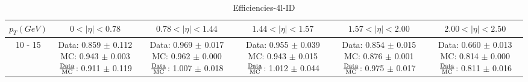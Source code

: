 \documentclass[final,letterpaper,twoside,12pt]{article}
\begin{document}
\begin{table}[htbp]
\begin{adjustwidth}{-4em}{-4em}
\centering
\begin{tabular}{|c|c|c|c|c|c|} \hline 
$p_{T} (GeV)$& $0 < |\eta| < 0.78$ & $0.78 < |\eta| < 1.44$ & $1.44 < |\eta| < 1.57$ & $1.57 < |\eta| < 2.00$ & $2.00 < |\eta| < 2.50$  \\ 
\hline \hline 
10 - 15 & \parbox[c]{1.1 in}{ \scriptsize  Data: 0.859 $\pm$ 0.112 \newline MC: 0.943 $\pm$ 0.003 \newline $\frac{\rm{Data}}{\rm{MC}}$: 0.911 $\pm$ 0.119} & \parbox[c]{1.1 in}{ \scriptsize  Data: 0.969 $\pm$ 0.017 \newline MC: 0.962 $\pm$ 0.000 \newline $\frac{\rm{Data}}{\rm{MC}}$: 1.007 $\pm$ 0.018} & \parbox[c]{1.1 in}{ \scriptsize  Data: 0.955 $\pm$ 0.039 \newline MC: 0.943 $\pm$ 0.015 \newline $\frac{\rm{Data}}{\rm{MC}}$: 1.012 $\pm$ 0.044} & \parbox[c]{1.1 in}{ \scriptsize  Data: 0.854 $\pm$ 0.015 \newline MC: 0.876 $\pm$ 0.001 \newline $\frac{\rm{Data}}{\rm{MC}}$: 0.975 $\pm$ 0.017} & \parbox[c]{1.1 in}{ \scriptsize  Data: 0.660 $\pm$ 0.013 \newline MC: 0.814 $\pm$ 0.000 \newline $\frac{\rm{Data}}{\rm{MC}}$: 0.811 $\pm$ 0.016}\\ \hline 
\end{tabular}
\caption {Efficiencies-4l-ID}
\label{tab:cqdata0}
\end{adjustwidth}\end{table}
\end{document}

